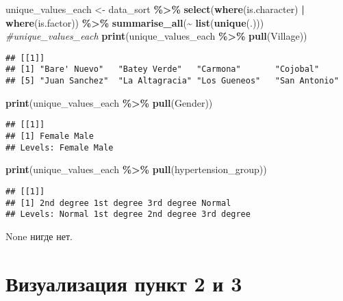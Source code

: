 \documentclass[
]{article}
\newenvironment{Shaded}{\begin{snugshade}}{\end{snugshade}}
\newcommand{\CommentTok}[1]{\textcolor[rgb]{0.56,0.35,0.01}{\textit{#1}}}
\newcommand{\FunctionTok}[1]{\textcolor[rgb]{0.13,0.29,0.53}{\textbf{#1}}}
\newcommand{\NormalTok}[1]{#1}
\newcommand{\OtherTok}[1]{\textcolor[rgb]{0.56,0.35,0.01}{#1}}
\newcommand{\SpecialCharTok}[1]{\textcolor[rgb]{0.81,0.36,0.00}{\textbf{#1}}}
\begin{document}
\begin{Shaded}
\begin{Highlighting}[]
\NormalTok{unique\_values\_each }\OtherTok{\textless{}{-}}\NormalTok{ data\_sort }\SpecialCharTok{\%\textgreater{}\%}
  \FunctionTok{select}\NormalTok{(}\FunctionTok{where}\NormalTok{(is.character) }\SpecialCharTok{|} \FunctionTok{where}\NormalTok{(is.factor)) }\SpecialCharTok{\%\textgreater{}\%}
  \FunctionTok{summarise\_all}\NormalTok{(}\SpecialCharTok{\textasciitilde{}} \FunctionTok{list}\NormalTok{(}\FunctionTok{unique}\NormalTok{(.)))}
\CommentTok{\#unique\_values\_each}
\FunctionTok{print}\NormalTok{(unique\_values\_each }\SpecialCharTok{\%\textgreater{}\%} \FunctionTok{pull}\NormalTok{(Village))}
\end{Highlighting}
\end{Shaded}

\begin{verbatim}
## [[1]]
## [1] "Bare' Nuevo"   "Batey Verde"   "Carmona"       "Cojobal"      
## [5] "Juan Sanchez"  "La Altagracia" "Los Gueneos"   "San Antonio"
\end{verbatim}

\begin{Shaded}
\begin{Highlighting}[]
\FunctionTok{print}\NormalTok{(unique\_values\_each }\SpecialCharTok{\%\textgreater{}\%} \FunctionTok{pull}\NormalTok{(Gender))}
\end{Highlighting}
\end{Shaded}

\begin{verbatim}
## [[1]]
## [1] Female Male  
## Levels: Female Male
\end{verbatim}

\begin{Shaded}
\begin{Highlighting}[]
\FunctionTok{print}\NormalTok{(unique\_values\_each }\SpecialCharTok{\%\textgreater{}\%} \FunctionTok{pull}\NormalTok{(hypertension\_group))}
\end{Highlighting}
\end{Shaded}

\begin{verbatim}
## [[1]]
## [1] 2nd degree 1st degree 3rd degree Normal    
## Levels: Normal 1st degree 2nd degree 3rd degree
\end{verbatim}

None нигде нет.

\section{Визуализация пункт 2 и
3}\label{ux432ux438ux437ux443ux430ux43bux438ux437ux430ux446ux438ux44f-ux43fux443ux43dux43aux442-2-ux438-3}
\end{document}
